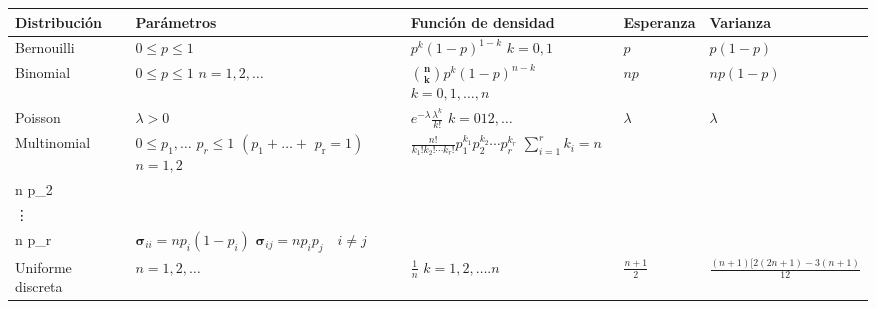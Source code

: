 \documentclass[
]{article}
\begin{document}
\begin{longtable}[]{@{}
  >{\centering\arraybackslash}p{}
  >{\centering\arraybackslash}p{}
  >{\centering\arraybackslash}p{}
  >{\centering\arraybackslash}p{}
  >{\centering\arraybackslash}p{}@{}}
\toprule\noalign{}
\begin{minipage}[b]{\linewidth}\centering
Distribución
\end{minipage} & \begin{minipage}[b]{\linewidth}\centering
Parámetros
\end{minipage} & \begin{minipage}[b]{\linewidth}\centering
Función de densidad
\end{minipage} & \begin{minipage}[b]{\linewidth}\centering
Esperanza
\end{minipage} & \begin{minipage}[b]{\linewidth}\centering
Varianza
\end{minipage} \\
\midrule\noalign{}
\endhead
\bottomrule\noalign{}
\endlastfoot
Bernouilli & \(0 \leq p \leq 1\) & \(p^{k}(1-p)^{1-k}\) \(k=0,1\) & \(p\) & \(p(1-p)\) \\
Binomial & \(0 \leq p \leq 1\) \(n=1,2, \ldots\) & \(\binom{\mathbf{n}}{\mathbf{k}} p^{k}(1-p)^{n-k}\) \(k=0,1, \ldots, n\) & \(n p\) & \(n p(1-p)\) \\
Poisson & \(\lambda>0\) & \(e^{-\lambda} \frac{\lambda^{k}}{k!}\) \(k=012, \ldots\) & \(\lambda\) & \(\lambda\) \\
Multinomial & \(0 \leq p_{1}, \ldots\) \(p_{r} \leq 1\) \(\left(p_{1}+\ldots+\right.\) \(\left.p_{\mathrm{r}}=1\right)\) \(n=1,2\) & \(\frac{n!}{k_{1}!k_{2}!\cdots k_{r}!} p_{1}^{k_{1}} p_{2}^{k_{2}} \cdots p_{r}^{k_{r}}\) \(\sum_{i=1}^{r} k_{i}=n\) & \(\left(\begin{array}{c}n p_{1} \\ n p_{2} \\ \vdots \\ n p_{r}\end{array}\right)\) & \(\boldsymbol{\sigma}_{i i}=n p_{i}\left(1-p_{i}\right)\) \(\boldsymbol{\sigma}_{i j}=n p_{i} p_{j} \quad i \neq j\) \\
Uniforme discreta & \(n=1,2, \ldots\) & \(\frac{1}{n}\) \(k=1,2, \ldots . n\) & \(\frac{n+1}{2}\) & \(\frac{(n+1)[2(2 n+1)-3(n+1)}{12}\) \\

\end{longtable}
\end{document}
